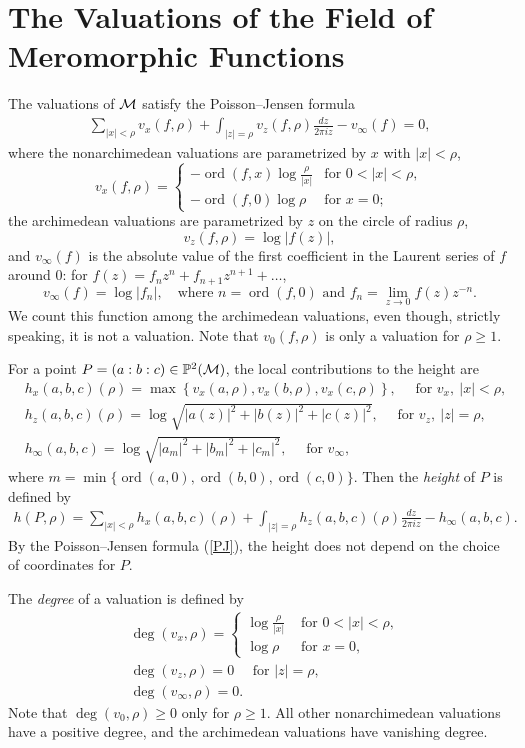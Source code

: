 \documentclass{amsart}
\newcommand\ord{\operatorname{ord}}	\newcommand\disc{\operatorname{disc}}
\theoremstyle{definition}\newtheorem{definition}[theorem]{Definition}
\theoremstyle{remark}\newtheorem{remark}[theorem]{Remark}
\numberwithin{equation}{section}
\begin{document}
\section{The Valuations of the Field of Meromorphic Functions}
\label{S: Nevan}

The valuations of $\mathcal{M}$ satisfy the Poisson--Jensen formula
\begin{gather}\label{PJ}
\sum_{|x|<\rho}v_x(f,\rho)+\int_{|z|=\rho}v_z(f,\rho)\frac{dz}{2\pi iz}-v_\infty(f)=0,
\end{gather}
where the nonarchimedean valuations are parametrized by $x$ with $|x|<\rho$,
$$
v_x(f,\rho)=\begin{cases}
-\ord(f,x)\log\frac\rho{|x|}	&\text{for }0<|x|<\rho,\\
-\ord(f,0)\log\rho		&\text{for }x=0;
\end{cases}
$$
the archimedean valuations are parametrized by $z$ on the circle of radius $\rho$,
$$
v_z(f,\rho)=\log|f(z)|,
$$
and $v_\infty(f)$ is the absolute value of the first coefficient in the Laurent series of $f$ around $0$:
for $f(z)=f_nz^n+f_{n+1}z^{n+1}+\dots$,
$$
v_\infty(f)=\log|f_n|,\quad\text{where $n=\ord(f,0)$ and }f_n=\lim_{z\to0}f(z)z^{-n}.
$$
We count this function among the archimedean valuations,
even though,
strictly speaking,
 it is not a valuation.
Note that $v_0(f,\rho)$ is only a valuation for $\rho\geq1$.

For a point $P=(a:b:c)\in\mathbb{P}^2(\mathcal{M})$,
the local contributions to the height are
\begin{align*}
&h_x(a,b,c)(\rho)=\max\left\{v_x(a,\rho),v_x(b,\rho),v_x(c,\rho)\right\},\quad\text{ for }v_x,\ |x|<\rho,\\
&h_z(a,b,c)(\rho)=\log\sqrt{|a(z)|^2+|b(z)|^2+|c(z)|^2},			\quad\text{ for }v_z,\ |z|=\rho,\\
&h_\infty(a,b,c)=\log\sqrt{|a_m|^2+|b_m|^2+|c_m|^2},			\quad\text{ for }v_\infty,
\end{align*}
where $m=\min\{\ord(a,0),\ord(b,0),\ord(c,0)\}$.
Then the {\em height\/} of $P$ is defined by
\begin{gather}\label{height}
h(P,\rho)=\sum_{|x|<\rho}h_x(a,b,c)(\rho)+\int_{|z|=\rho}h_z(a,b,c)(\rho)\frac{dz}{2\pi iz}-h_\infty(a,b,c).
\end{gather}
By the Poisson--Jensen formula (\ref{PJ}),
the height does not depend on the choice of coordinates for $P$.

The {\em degree\/} of a valuation is defined by
\begin{align*}
&\deg(v_x,\rho)=\begin{cases}
\log\frac\rho{|x|}&\text{ for }0<|x|<\rho,\\
\log\rho	&\text{ for }x=0,
\end{cases}\\
&\deg(v_z,\rho)=0\quad\text{ for }|z|=\rho,\\
&\deg(v_\infty,\rho)=0.
\end{align*}
Note that $\deg(v_0,\rho)\geq0$ only for $\rho\geq1$.
All other nonarchimedean valuations have a positive degree,
and the archimedean valuations have vanishing degree.
\end{document}
